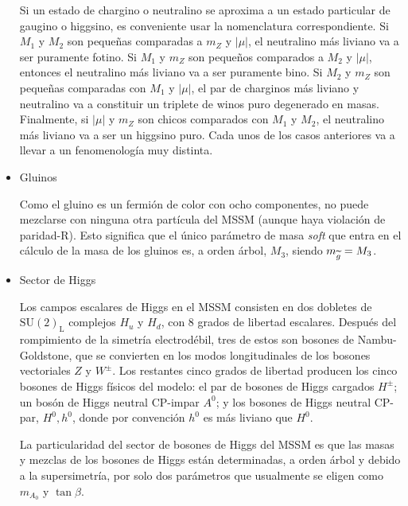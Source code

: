 \begin{itemize}

Si un estado de chargino o neutralino se aproxima a un estado particular de
gaugino o higgsino, es conveniente usar la nomenclatura correspondiente. Si
$M_1$ y $M_2$ son pequeñas comparadas a $m_Z$ y $|\mu|$, el neutralino más
liviano va a ser puramente fotino. Si $M_1$ y $m_Z$ son pequeños comparados a
$M_2$ y $|\mu|$, entonces el neutralino más liviano va a ser puramente bino. Si
$M_2$ y $m_Z$ son pequeñas comparadas con $M_1$ y $|\mu|$, el par de charginos
más liviano y neutralino va a constituir un triplete de winos puro degenerado en
masas. Finalmente, si $|\mu|$ y $m_Z$ son chicos comparados con $M_1$ y $M_2$,
el neutralino más liviano va a ser un higgsino puro. Cada unos de los casos
anteriores va a llevar a un fenomenología muy distinta.


\item Gluinos

Como el gluino es un fermión de color con ocho componentes, no puede mezclarse con ninguna
otra partícula del MSSM (aunque haya violación de paridad-R). Esto significa que el único
parámetro de masa \emph{soft} que entra en el cálculo de la masa de los gluinos es, a
orden árbol, $M_3$, siendo $m_{\widetilde{g}} = M_3$.


\item Sector de Higgs

  Los campos escalares de Higgs en el MSSM consisten en dos dobletes de
  $\text{SU}(2)_\text{L}$ complejos $H_u$ y $H_d$, con 8 grados de libertad
  escalares. Después del rompimiento de la simetría electrodébil, tres de estos
  son bosones de Nambu-Goldstone, que se convierten en los modos longitudinales de
  los bosones vectoriales $Z$ y $W^\pm$. Los restantes cinco grados de libertad
  producen los cinco bosones de Higgs físicos del modelo: el par de bosones de
  Higgs cargados $H^\pm$; un bosón de Higgs neutral CP-impar $A^0$; y los bosones
  de Higgs neutral CP-par, $H^0,h^0$, donde por convención $h^0$ es más liviano
  que $H^0$.

  La particularidad del sector de bosones de Higgs del MSSM es que las masas y mezclas
  de los bosones de Higgs están determinadas, a orden árbol y debido a la supersimetría,
  por solo dos parámetros que usualmente se eligen como $m_{A_0}$ y $\tan \beta$.


\end{itemize}


